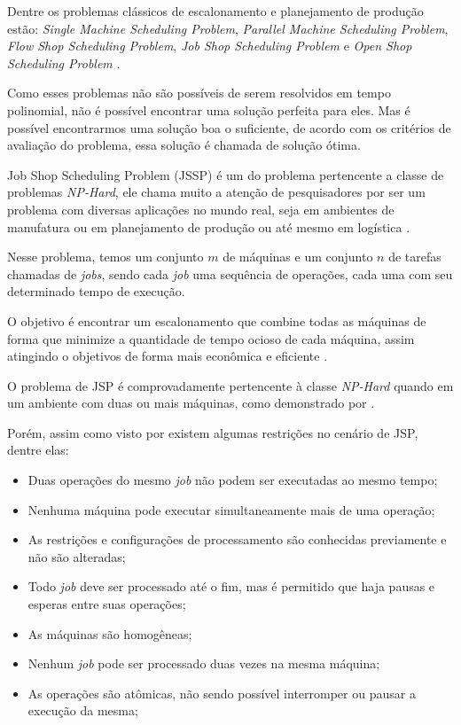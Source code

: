     Dentre os problemas clássicos de escalonamento e planejamento de produção estão: 
    \textit{Single Machine Scheduling Problem}, 
    \textit{Parallel Machine Scheduling Problem}, 
    \textit{Flow Shop Scheduling Problem}, 
    \textit{Job Shop Scheduling Problem} e 
    \textit{Open Shop Scheduling Problem} 
    \cite{Allahverdi2008}.\newline

    Como esses problemas não são possíveis de serem resolvidos em tempo polinomial, não é possível encontrar uma solução perfeita para eles. Mas é possível encontrarmos uma solução boa o suficiente, de acordo com os critérios de avaliação do problema, essa solução é chamada de solução ótima.\newline

    Job Shop Scheduling Problem (JSSP) é um do problema pertencente a classe de problemas \textit{NP-Hard}, ele chama muito a atenção de pesquisadores por ser um problema com diversas aplicações no mundo real, seja em ambientes de manufatura ou em planejamento de produção ou até mesmo em logística \cite{Cheng1996}.\newline

    Nesse problema, temos um conjunto $m$ de máquinas e um conjunto $n$ de tarefas chamadas de \textit{jobs}, sendo cada \textit{job} uma sequência de operações, cada uma com seu determinado tempo de execução. \newline 

    O objetivo é encontrar um escalonamento que combine todas as máquinas de forma que minimize a quantidade de tempo ocioso de cada máquina, assim atingindo o objetivos de forma mais econômica e eficiente \cite{Cheng1996}. \newline

    O problema de JSP é comprovadamente pertencente à classe \textit{NP-Hard} quando em um ambiente com duas ou mais máquinas, como demonstrado por \cite{Lenstra1979}. \newline

    Porém, assim como visto por \cite{Bagchi1999} existem algumas restrições no cenário de JSP, dentre elas:
    \begin{itemize}
        \item Duas operações do mesmo \textit{job} não podem ser executadas ao mesmo tempo;
        \item Nenhuma máquina pode executar simultaneamente mais de uma operação;
        \item As restrições e configurações de processamento são conhecidas previamente e não são alteradas;
        \item Todo \textit{job} deve ser processado até o fim, mas é permitido que haja pausas e esperas entre suas operações;
        \item As máquinas são homogêneas;
        \item Nenhum \textit{job} pode ser processado duas vezes na mesma máquina;
        \item As operações são atômicas, não sendo possível interromper ou pausar a execução da mesma;
    \end{itemize}

